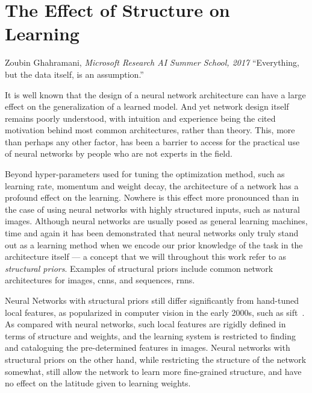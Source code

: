 \documentclass[thesis]{subfiles}
\begin{document}
	\chapter{The Effect of Structure on Learning}\label{motivation}
	\begin{chapquote}{Zoubin Ghahramani, \textit{Microsoft Research AI Summer School, 2017}}
		``Everything, but the data itself, is an assumption.''
	\end{chapquote}
	It is well known that the design of a neural network architecture can have a large effect on the generalization of a learned model. And yet network design itself remains poorly understood, with intuition and experience being the cited motivation behind most common architectures, rather than theory. This, more than perhaps any other factor, has been a barrier to access for the practical use of neural networks by people who are not experts in the field.
	
	Beyond hyper-parameters used for tuning the optimization method, such as learning rate, momentum and weight decay, the architecture of a network has a profound effect on the learning. Nowhere is this effect more pronounced than in the case of using neural networks with highly structured inputs, such as natural images. Although neural networks are usually posed as general learning machines, time and again it has been demonstrated that neural networks only truly stand out as a learning method when we encode our prior knowledge of the task in the architecture itself --- a concept that we will throughout this work refer to as \emph{structural priors}. Examples of structural priors include common network architectures for images, \glspl{cnn}, and sequences, \glspl{rnn}.
	
	Neural Networks with structural priors still differ significantly from hand-tuned local features, as popularized in computer vision in the early 2000s, such as \gls{sift}~\citep{Lowe2004}. As compared with neural networks, such local features are rigidly defined in terms of structure and weights, and the learning system is restricted to finding and cataloguing the pre-determined features in images. Neural networks with structural priors on the other hand, while restricting the structure of the network somewhat, still allow the network to learn more fine-grained structure, and have no effect on the latitude given to learning weights.
	
\end{document}

